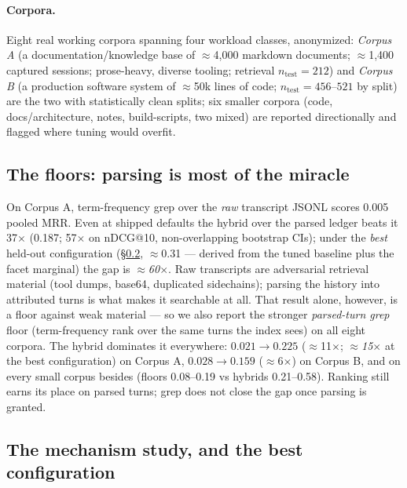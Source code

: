 \documentclass[twocolumn,10pt]{article}
\newcommand{\x}{$\times$}
\begin{document}
\paragraph{Corpora.} Eight real working corpora spanning four workload classes, anonymized: \emph{Corpus A} (a documentation/knowledge base of $\approx$4{,}000 markdown documents; $\approx$1{,}400 captured sessions; prose-heavy, diverse tooling; retrieval $n_{\text{test}}=212$) and \emph{Corpus B} (a production software system of $\approx$50k lines of code; $n_{\text{test}}=456$--$521$ by split) are the two with statistically clean splits; six smaller corpora (code, docs/architecture, notes, build-scripts, two mixed) are reported directionally and flagged where tuning would overfit.

\subsection{The floors: parsing is most of the miracle}

On Corpus A, term-frequency grep over the \emph{raw} transcript JSONL scores 0.005 pooled MRR. Even at shipped defaults the hybrid over the parsed ledger beats it 37\x{} (0.187; 57\x{} on nDCG@10, non-overlapping bootstrap CIs); under the \emph{best} held-out configuration (\S\ref{sec:mechanisms}, $\approx$0.31 --- derived from the tuned baseline plus the facet marginal) the gap is \emph{$\approx$60\x}. Raw transcripts are adversarial retrieval material (tool dumps, base64, duplicated sidechains); parsing the history into attributed turns is what makes it searchable at all. That result alone, however, is a floor against weak material --- so we also report the stronger \emph{parsed-turn grep} floor (term-frequency rank over the same turns the index sees) on all eight corpora. The hybrid dominates it everywhere: $0.021 \to 0.225$ ($\approx$11\x; \emph{$\approx$15\x} at the best configuration) on Corpus A, $0.028 \to 0.159$ ($\approx$6\x) on Corpus B, and on every small corpus besides (floors 0.08--0.19 vs hybrids 0.21--0.58). Ranking still earns its place on parsed turns; grep does not close the gap once parsing is granted.

\subsection{The mechanism study, and the best configuration}\label{sec:mechanisms}
\end{document}
